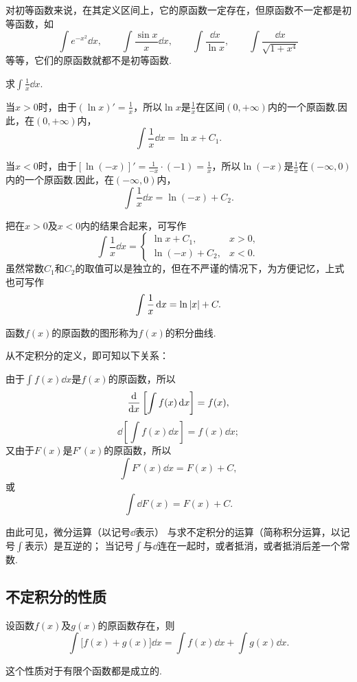 对初等函数来说，在其定义区间上，它的原函数一定存在，但原函数不一定都是初等函数，如\[
\int e^{-x^2} \dd{x}, \qquad
\int \frac{\sin x}{x} \dd{x}, \qquad
\int \frac{\dd{x}}{\ln{x}}, \qquad
\int \frac{\dd{x}}{\sqrt{1+x^4}}
\]
等等，它们的原函数就都不是初等函数.

\begin{example}
求\(\int \frac{1}{x} \dd{x}\).
\begin{solution}
当\(x > 0\)时，由于\((\ln x)' = \frac{1}{x}\)，所以\(\ln x\)是\(\frac{1}{x}\)在区间\((0,+\infty)\)内的一个原函数.因此，在\((0,+\infty)\)内，\[
\int \frac{1}{x} \dd{x} = \ln x + C_1.
\]

当\(x < 0\)时，由于\([\ln(-x)]' = \frac{1}{-x} \cdot (-1) = \frac{1}{x}\)，所以\(\ln(-x)\)是\(\frac{1}{x}\)在\((-\infty,0)\)内的一个原函数.因此，在\((-\infty,0)\)内，\[
\int \frac{1}{x} \dd{x} = \ln(-x) + C_2.
\]

把在\(x > 0\)及\(x < 0\)内的结果合起来，可写作\begin{equation}
\int \frac{1}{x} \dd{x} = \left\{ \begin{array}{lc}
\ln x + C_1, & x>0, \\
\ln(-x) + C_2, & x<0.
\end{array} \right.
\end{equation}
虽然常数\(C_1\)和\(C_2\)的取值可以是独立的，但在不严谨的情况下，为方便记忆，上式也可写作\begin{equation}
\int \frac{1}{x} \dd{x} = \ln\abs{x} + C.
\end{equation}
\end{solution}
\end{example}

\begin{definition}
函数\(f(x)\)的原函数的图形称为\(f(x)\)的积分曲线.
\end{definition}

从不定积分的定义，即可知以下关系：

由于\(\int f(x) \dd{x}\)是\(f(x)\)的原函数，所以\[
\dv{x} \left[ \int f(x) \dd{x} \right] = f(x),
\]\[
\dd\left[\int f(x) \dd{x}\right] = f(x) \dd{x};
\]又由于\(F(x)\)是\(F'(x)\)的原函数，所以\[
\int F'(x) \dd{x} = F(x) + C,
\]或\[
\int \dd{F(x)} = F(x) + C.
\]

由此可见，微分运算（以记号\(\dd\)表示）
与求不定积分的运算（简称积分运算，以记号\(\int\)表示）是互逆的；
当记号\(\int\)与\(\dd\)连在一起时，或者抵消，或者抵消后差一个常数.

\subsection{不定积分的性质}
\begin{property}
设函数\(f(x)\)及\(g(x)\)的原函数存在，则\[
\int \bigl[f(x) + g(x)\bigr] \dd{x} = \int f(x) \dd{x} + \int g(x) \dd{x}.
\]
\end{property}
这个性质对于有限个函数都是成立的.

